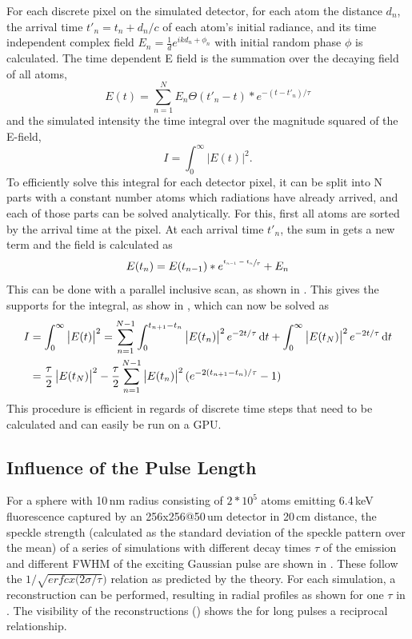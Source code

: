 For each discrete pixel on the simulated detector, for each atom the distance $d_n$, the arrival time $t'_n=t_n+d_n/c$ of each atom's initial radiance, and its time independent complex field $E_n=\frac{1}{d} e^{ikd_n+\phi_n}$ with initial random phase $\phi$ is calculated.
The time dependent E field is the summation over the decaying field of all atoms,
\begin{equation}
E(t)=\sum_{n=1}^N  E_n \Theta(t'_n  - t) * e^{-(t-t'_n )/\tau}
\label{eq:tdsum}
\end{equation}
and the simulated intensity the time integral over the magnitude squared of the E-field,
\begin{equation}
I=\int_0^\infty \left| E(t) \right|^2 .
\label{eq:tdint}
\end{equation}
To efficiently solve this integral for each detector pixel, it can be split into N parts with a constant number atoms which radiations have already arrived, and each of those parts can be solved analytically. For this, first all atoms are sorted by the arrival time at the pixel. At each arrival time $t'_n$, the sum in  gets a new term and the field is calculated as
\begin{equation}
E(t_n)=E(t_{n-1})*e^{\sfrac{t_{n-1}-t_n}{\tau}}+E_n
\end{equation}
 This can be done with a parallel inclusive scan, as shown in . This gives the supports for the integral, as show in , which can now be solved as
\begin{align}
	I&=\int_0^\infty \left| E(t) \right|^2 = \sum_{n=1}^{N-1} \int_0^{t_{n+1}-t_n} \left|E(t_n)\right|^2 e^{-2t/\tau} \dif t +\int_0^\infty \left| E(t_N)\right|^2 e^{-2t/\tau} \dif t \\
	 &=  \frac{\tau}{2}  \left|E(t_N)\right|^2 -  \frac{\tau}{2}\sum_{n=1}^{N-1} \left|E(t_n)\right|^2 (e^{-2 (t_{n+1}-t_n)/\tau} -1 ) 
\end{align}
This procedure is efficient in regards of discrete time steps that need to be calculated and can easily be run on a GPU.

\subsection{Influence of the Pulse Length}
For a sphere with 10\,nm radius consisting of $2*10^5$ atoms emitting 6.4\,keV fluorescence captured by an 256x256@50\,um detector in 20\,cm distance, the speckle strength (calculated as the standard deviation of the speckle pattern over the mean) of a series of simulations with different decay times $\tau$ of the emission and different FWHM of the exciting Gaussian pulse are shown in .  These follow the $1/\sqrt{erfcx(2\sigma/\tau})$ relation as predicted by the theory.  For each simulation, a reconstruction can be performed, resulting in radial profiles as shown for one $\tau$ in . The visibility of the reconstructions () shows the for long pulses a reciprocal relationship.

